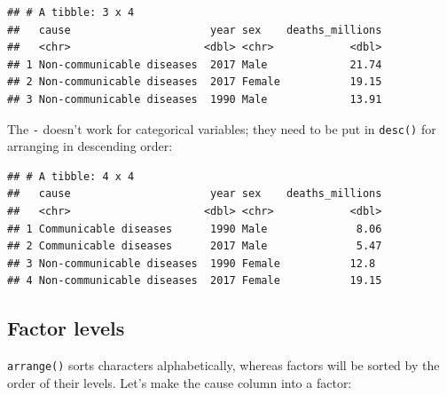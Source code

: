 \documentclass[
  12pt,
  krantz2]{krantz}
\makeatletter
\newenvironment{Shaded}{\begin{snugshade}}{\end{snugshade}}
\newcommand{\CommentTok}[1]{\textcolor[rgb]{0.56,0.35,0.01}{\textit{#1}}}
\newcommand{\DataTypeTok}[1]{\textcolor[rgb]{0.13,0.29,0.53}{#1}}
\newcommand{\DecValTok}[1]{\textcolor[rgb]{0.00,0.00,0.81}{#1}}
\newcommand{\KeywordTok}[1]{\textcolor[rgb]{0.13,0.29,0.53}{\textbf{#1}}}
\newcommand{\NormalTok}[1]{#1}
\newcommand{\OperatorTok}[1]{\textcolor[rgb]{0.81,0.36,0.00}{\textbf{#1}}}
\newcommand{\StringTok}[1]{\textcolor[rgb]{0.31,0.60,0.02}{#1}}
\newenvironment{kframe}{%
\medskip{}
\setlength{\fboxsep}{.8em}
 \def\at@end@of@kframe{}%
 \ifinner\ifhmode%
  \def\at@end@of@kframe{\end{minipage}}%
  \begin{minipage}{\columnwidth}%
 \fi\fi%
 \def\FrameCommand##1{\hskip\@totalleftmargin \hskip-\fboxsep
 \colorbox{shadecolor}{##1}\hskip-\fboxsep
     \hskip-\linewidth \hskip-\@totalleftmargin \hskip\columnwidth}%
 \MakeFramed {\advance\hsize-\width
   \@totalleftmargin\z@ \linewidth\hsize
   \@setminipage}}%
 {\par\unskip\endMakeFramed%
 \at@end@of@kframe}
\renewenvironment{Shaded}{\begin{kframe}}{\end{kframe}}
\makeatother
\begin{document}
\begin{verbatim}
## # A tibble: 3 x 4
##   cause                      year sex    deaths_millions
##   <chr>                     <dbl> <chr>            <dbl>
## 1 Non-communicable diseases  2017 Male             21.74
## 2 Non-communicable diseases  2017 Female           19.15
## 3 Non-communicable diseases  1990 Male             13.91
\end{verbatim}

The \texttt{-} doesn't work for categorical variables; they need to be put in \texttt{desc()} for arranging in descending order:

\begin{Shaded}
\end{Shaded}

\begin{verbatim}
## # A tibble: 4 x 4
##   cause                      year sex    deaths_millions
##   <chr>                     <dbl> <chr>            <dbl>
## 1 Communicable diseases      1990 Male              8.06
## 2 Communicable diseases      2017 Male              5.47
## 3 Non-communicable diseases  1990 Female           12.8 
## 4 Non-communicable diseases  2017 Female           19.15
\end{verbatim}

\hypertarget{factor-levels}{%
\subsection{Factor levels}\label{factor-levels}}


\texttt{arrange()} sorts characters alphabetically, whereas factors will be sorted by the order of their levels.
Let's make the cause column into a factor:

\begin{Shaded}
\end{Shaded}
\end{document}
